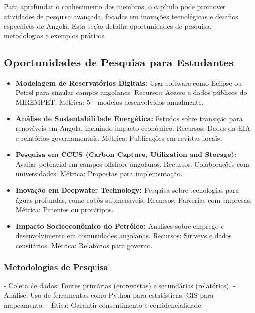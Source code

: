 \documentclass[12pt]{article}
\begin{document}
Para aprofundar o conhecimento dos membros, o capítulo pode promover atividades de pesquisa avançada, focadas em inovações tecnológicas e desafios específicos de Angola. Esta seção detalha oportunidades de pesquisa, metodologias e exemplos práticos.

\subsection{Oportunidades de Pesquisa para Estudantes}
\begin{itemize}
    \item \textbf{Modelagem de Reservatórios Digitais:} Usar software como Eclipse ou Petrel para simular campos angolanos. Recursos: Acesso a dados públicos do MIREMPET. Métrica: 5+ modelos desenvolvidos anualmente.
    \item \textbf{Análise de Sustentabilidade Energética:} Estudos sobre transição para renováveis em Angola, incluindo impacto econômico. Recursos: Dados da EIA e relatórios governamentais. Métrica: Publicações em revistas locais.
    \item \textbf{Pesquisa em CCUS (Carbon Capture, Utilization and Storage):} Avaliar potencial em campos offshore angolanos. Recursos: Colaborações com universidades. Métrica: Propostas para implementação.
    \item \textbf{Inovação em Deepwater Technology:} Pesquisa sobre tecnologias para águas profundas, como robôs submersíveis. Recursos: Parcerias com empresas. Métrica: Patentes ou protótipos.
    \item \textbf{Impacto Socioeconômico do Petróleo:} Análises sobre emprego e desenvolvimento em comunidades angolanas. Recursos: Surveys e dados censitários. Métrica: Relatórios para governo.
\end{itemize}

\subsubsection{Metodologias de Pesquisa}
- Coleta de dados: Fontes primárias (entrevistas) e secundárias (relatórios).
- Análise: Uso de ferramentas como Python para estatísticas, GIS para mapeamento.
- Ética: Garantir consentimento e confidencialidade.
\end{document}
